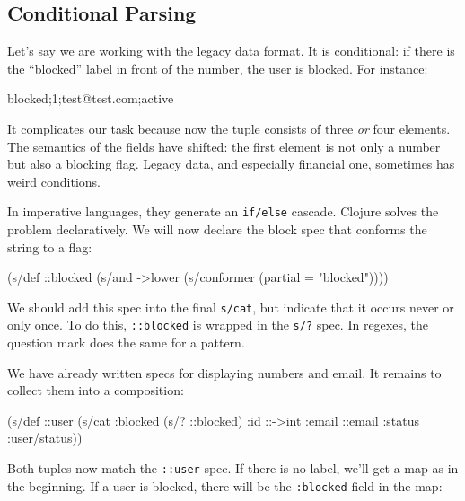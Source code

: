 \fi

\subsection{Conditional Parsing}

Let's say we are working with the legacy data format. It is conditional: if there is the ``blocked'' label in front of the number, the user is blocked. For instance:

\begin{english}
  \begin{text}
blocked;1;test@test.com;active
  \end{text}
\end{english}

It complicates our task because now the tuple consists of three
\emph{or} four elements. The semantics of the fields have shifted: the first element is not only a number but also a blocking flag. Legacy data, and especially financial one, sometimes has weird conditions.

In imperative languages, they generate an \verb|if/else| cascade. Clojure solves the problem declaratively. We will now declare the block spec that conforms the string to a flag:

\begin{english}
  \begin{clojure}
(s/def ::blocked
  (s/and
   ->lower
   (s/conformer (partial = "blocked"))))
  \end{clojure}
\end{english}


We should add this spec into the final \verb|s/cat|, but indicate that it occurs never or only once. To do this, \verb|::blocked| is wrapped in the \verb|s/?| spec. In regexes, the question mark does the same for a pattern.

We have already written specs for displaying numbers and email. It remains to collect them into a composition:

\begin{english}
  \begin{clojure}
(s/def ::user
  (s/cat :blocked (s/? ::blocked)
         :id ::->int
         :email ::email
         :status :user/status))
  \end{clojure}
\end{english}

Both tuples now match the \verb|::user| spec. If there is no label, we'll get a map as in the beginning. If a user is blocked, there will be the  \verb|:blocked| field in the map:

